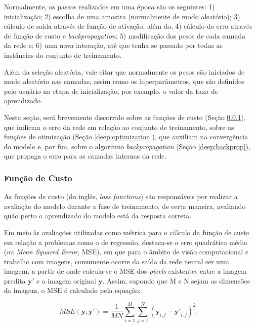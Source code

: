 Normalmente, os passos realizados em uma época são os seguintes: 1) inicialização; 2) escolha de uma amostra (normalmente de modo aleatório); 3) cálculo de saída através de função de ativação, além do, 4) cálculo do erro através de função de custo e \textit{backpropagation}; 5) modificação dos pesos de cada camada da rede e; 6) uma nova interação, até que tenha se passado por todas as instâncias do conjunto de treinamento.

Além da seleção aleatória, vale citar que normalmente os pesos são iniciados de modo aleatório nas camadas, assim como os hiperparâmetros, que são definidos pelo usuário na etapa de inicialização, por exemplo, o valor da taxa de aprendizado.

Nesta seção, será brevemente discorrido sobre as funções de custo (Seção \ref{deep:cust}), que indicam o erro da rede em relação ao conjunto de treinamento, sobre as funções de otimização (Seção \ref{deep:optimization}), que auxiliam na convergência do modelo e, por fim, sobre o algoritmo \textit{backpropagation} (Seção \ref{deep:backprop}), que propaga o erro para as camadas internas da rede.


\subsubsection{Função de Custo}
\label{deep:cust}

As funções de custo (do inglês, \textit{loss functions}) são responsáveis por realizar a avaliação do modelo durante a fase de treinamento, de certa maneira, avaliando quão perto o aprendizado do modelo está da resposta correta.

Em meio às avaliações utilizadas como métrica para o cálculo da função de custo em relação a problemas como o de regressão, destaca-se o erro quadrático médio (ou \textit{Mean Squared Error}, MSE)\citep{Wang2004}, em que para o âmbito de visão computacional e trabalho com imagens, comumente ocorre da saída da rede neural ser uma imagem, a partir de onde calcula-se o MSE dos \textit{pixels} existentes entre a imagem predita $\boldsymbol{y'}$ e a imagem original $\boldsymbol{y}$. Assim, supondo que M e N sejam as dimensões da imagem, o MSE é calculado pela equação:

\begin{equation}
    \label{deep:eq:9}
    MSE(\boldsymbol{y}, \boldsymbol{y'}) = \frac{1}{MN} \sum_{i=1}^{M} \sum_{j=1}^{N} (\boldsymbol{y}_{i,j} - \boldsymbol{y'}_{i,j})^2.
\end{equation}

